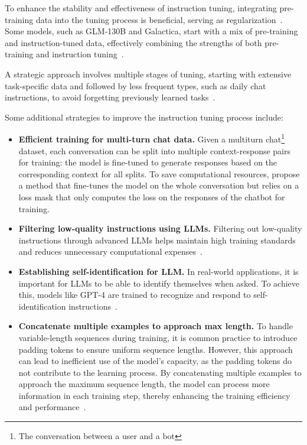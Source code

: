 To enhance the stability and effectiveness of instruction tuning, integrating pre-training data into the tuning process is beneficial, serving as regularization~\cite{wei2022fine}.
Some models, such as GLM-130B and Galactica, start with a mix of pre-training and instruction-tuned data, effectively combining the strengths of both pre-training and instruction tuning~\cite{chowdhery2022palm}.

A strategic approach involves multiple stages of tuning, starting with extensive task-specific data and followed by less frequent types, such as daily chat instructions, to avoid forgetting previously learned tasks~\cite{raffel2023exploring}.

Some additional strategies to improve the instruction tuning process include:
\begin{itemize}
	\item \textbf{Efficient training for multi-turn chat data.} {Given a multiturn chat\footnote{The conversation between a user and a bot} dataset, each conversation can be split into multiple context-response pairs for training: the model is fine-tuned to generate responses based on the corresponding context for all splits. To save computational resources, \textcite{chiang2023vicuna} propose a method that fine-tunes the model on the whole conversation but relies on a loss mask that only computes the loss on the responses of the chatbot for training.
	      }
	\item \textbf{Filtering low-quality instructions using LLMs.} {Filtering out low-quality instructions through advanced LLMs helps maintain high training standards and reduces unnecessary computational expenses~\cite{wei2022fine}.}
	\item \textbf{Establishing self-identification for LLM.} {In real-world applications, it is important for LLMs to be able to identify themselves when asked. To achieve this, models like GPT-4 are trained to recognize and respond to self-identification instructions~\cite{radford2023gpt4}.
	      }
	\item \textbf{Concatenate multiple examples to approach max length.} {
		      To handle variable-length sequences during training, it is common practice to introduce padding tokens to ensure uniform sequence lengths. However, this approach can lead to inefficient use of the model's capacity, as the padding tokens do not contribute to the learning process. By concatenating multiple examples to approach the maximum sequence length, the model can process more information in each training step, thereby enhancing the training efficiency and performance~\cite{krell2021efficient}.
}
\end{itemize}
